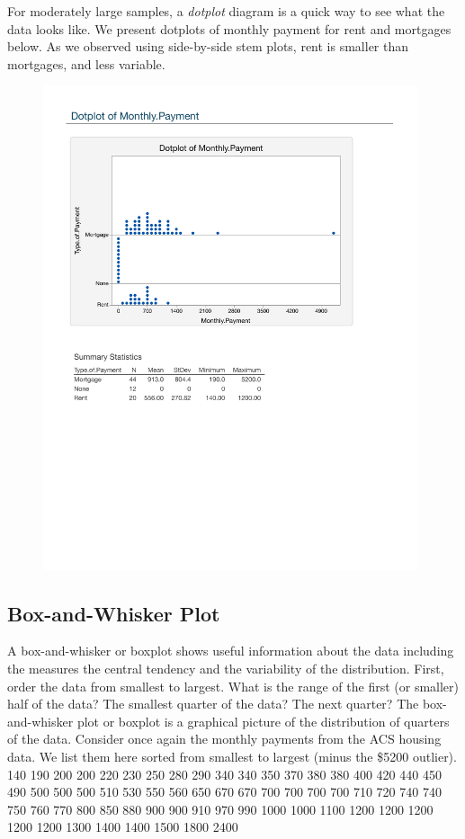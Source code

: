 \documentclass[11pt, chapterprefix=true]{scrbook}\usepackage[]{graphicx}\usepackage[]{color}
\begin{document}
For moderately large samples, a \textit{dotplot} diagram is a quick way to see what the data looks like.  We present dotplots of monthly payment for rent and mortgages below.  As we observed using side-by-side stem plots, rent is smaller than mortgages, and less variable.

\begin{figure}[htbp]
   \centering
   \includegraphics[width=11cm]{chapters/Chapter_2/ext_figure/dotchart.pdf} %
\end{figure}

\subsection{Box-and-Whisker Plot}

A box-and-whisker or boxplot shows useful information about the data including the measures the central tendency and the variability of the distribution.  First, order the data from smallest to largest.  What is the range of the first (or smaller) half of the data?  The smallest quarter of the data?  The next quarter?  The box-and-whisker plot or boxplot is a graphical picture of the distribution of quarters of the data.  Consider once again the monthly payments from the ACS housing data.  We list them here sorted from smallest to largest (minus the \$5200 outlier).
      {\small{
      140  190  200  200  220  230  250  280  290  340  340  350  370  380  380
      400  420  440  450  490  500  500  500  510  530  550  560  650  670  670
      700  700  700  700  710  720  740  740  750  760  770  800  850  880  900
      900  910  970  990 1000 1000 1100 1200 1200 1200 1200 1200 1300 1400 1400
     1500 1800 2400
      }}
\end{document}
